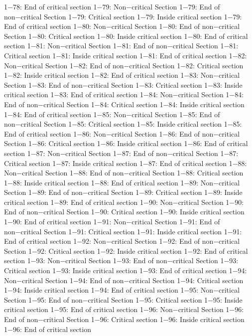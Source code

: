 1−78: End of critical section
1−79: Non−critical Section
1−79: End of non−critical Section
1−79: Critical section
1−79: Inside critical section
1−79: End of critical section
1−80: Non−critical Section
1−80: End of non−critical Section
1−80: Critical section
1−80: Inside critical section
1−80: End of critical section
1−81: Non−critical Section
1−81: End of non−critical Section
1−81: Critical section
1−81: Inside critical section
1−81: End of critical section
1−82: Non−critical Section
1−82: End of non−critical Section
1−82: Critical section
1−82: Inside critical section
1−82: End of critical section
1−83: Non−critical Section
1−83: End of non−critical Section
1−83: Critical section
1−83: Inside critical section
1−83: End of critical section
1−84: Non−critical Section
1−84: End of non−critical Section
1−84: Critical section
1−84: Inside critical section
1−84: End of critical section
1−85: Non−critical Section
1−85: End of non−critical Section
1−85: Critical section
1−85: Inside critical section
1−85: End of critical section
1−86: Non−critical Section
1−86: End of non−critical Section
1−86: Critical section
1−86: Inside critical section
1−86: End of critical section
1−87: Non−critical Section
1−87: End of non−critical Section
1−87: Critical section
1−87: Inside critical section
1−87: End of critical section
1−88: Non−critical Section
1−88: End of non−critical Section
1−88: Critical section
1−88: Inside critical section
1−88: End of critical section
1−89: Non−critical Section
1−89: End of non−critical Section
1−89: Critical section
1−89: Inside critical section
1−89: End of critical section
1−90: Non−critical Section
1−90: End of non−critical Section
1−90: Critical section
1−90: Inside critical section
1−90: End of critical section
1−91: Non−critical Section
1−91: End of non−critical Section
1−91: Critical section
1−91: Inside critical section
1−91: End of critical section
1−92: Non−critical Section
1−92: End of non−critical Section
1−92: Critical section
1−92: Inside critical section
1−92: End of critical section
1−93: Non−critical Section
1−93: End of non−critical Section
1−93: Critical section
1−93: Inside critical section
1−93: End of critical section
1−94: Non−critical Section
1−94: End of non−critical Section
1−94: Critical section
1−94: Inside critical section
1−94: End of critical section
1−95: Non−critical Section
1−95: End of non−critical Section
1−95: Critical section
1−95: Inside critical section
1−95: End of critical section
1−96: Non−critical Section
1−96: End of non−critical Section
1−96: Critical section
1−96: Inside critical section
1−96: End of critical section
